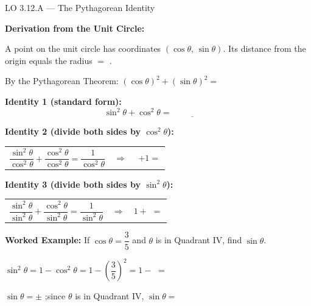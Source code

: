 \documentclass[10pt]{article}
\begin{document}
\begin{notesbox}{LO 3.12.A --- The Pythagorean Identity}

\textbf{Derivation from the Unit Circle:}

A point on the unit circle has coordinates $(\cos\theta,\,\sin\theta)$.
Its distance from the origin equals the radius $= $ \underline{\hspace{1cm}}.

By the Pythagorean Theorem: $(\cos\theta)^2 + (\sin\theta)^2 = $ \underline{\hspace{1.5cm}}

\vspace{6pt}
\textbf{Identity 1 (standard form):}
$$\sin^2\theta + \cos^2\theta = \underline{\hspace{2cm}}$$

\vspace{4pt}
\textbf{Identity 2 (divide both sides by $\cos^2\theta$):}

\vspace{4pt}
\renewcommand{\arraystretch}{2.2}
\begin{tabular}{@{}l@{\quad}l@{}}
$\dfrac{\sin^2\theta}{\cos^2\theta} + \dfrac{\cos^2\theta}{\cos^2\theta}
= \dfrac{1}{\cos^2\theta}$
&
$\Longrightarrow\quad$ \underline{\hspace{2.2cm}} $+ 1 = $ \underline{\hspace{2.2cm}} \\
\end{tabular}

\vspace{4pt}
\textbf{Identity 3 (divide both sides by $\sin^2\theta$):}

\vspace{4pt}
\begin{tabular}{@{}l@{\quad}l@{}}
$\dfrac{\sin^2\theta}{\sin^2\theta} + \dfrac{\cos^2\theta}{\sin^2\theta}
= \dfrac{1}{\sin^2\theta}$
&
$\Longrightarrow\quad 1 + $ \underline{\hspace{2.2cm}} $= $ \underline{\hspace{2.2cm}} \\
\end{tabular}

\vspace{8pt}
\textbf{Worked Example:} If $\cos\theta = \dfrac{3}{5}$ and $\theta$ is in Quadrant IV, find $\sin\theta$.

\vspace{4pt}
$\sin^2\theta = 1 - \cos^2\theta = 1 - \left(\dfrac{3}{5}\right)^2
= 1 - $ \underline{\hspace{1.5cm}} $= $ \underline{\hspace{1.5cm}}

\vspace{4pt}
$\sin\theta = \pm$ \underline{\hspace{1.5cm}};\quad since $\theta$ is in Quadrant IV, $\sin\theta = $ \underline{\hspace{1.5cm}}

\end{notesbox}
\end{document}
